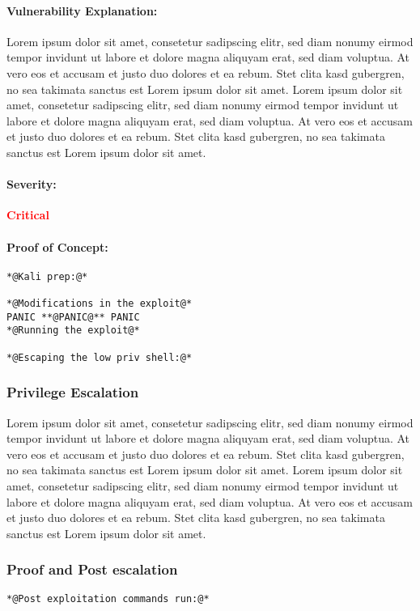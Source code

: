 \paragraph{Vulnerability Explanation:}
Lorem ipsum dolor sit amet, consetetur sadipscing elitr, sed diam nonumy eirmod
tempor invidunt ut labore et dolore magna aliquyam erat, sed diam voluptua. At
vero eos et accusam et justo duo dolores et ea rebum. Stet clita kasd
gubergren, no sea takimata sanctus est Lorem ipsum dolor sit amet. Lorem ipsum
dolor sit amet, consetetur sadipscing elitr, sed diam nonumy eirmod tempor
invidunt ut labore et dolore magna aliquyam erat, sed diam voluptua. At vero
eos et accusam et justo duo dolores et ea rebum. Stet clita kasd gubergren, no
sea takimata sanctus est Lorem ipsum dolor sit amet.

\paragraph{Severity:}
\textbf{\textcolor{red}{Critical}}

\paragraph{Proof of Concept:}
\begin{lstlisting}[caption={Exploitation of \hostname}]
*@Kali prep:@*

*@Modifications in the exploit@*
PANIC **@PANIC@** PANIC
*@Running the exploit@*

*@Escaping the low priv shell:@*
\end{lstlisting}


\ifdefined\root
\subsubsection{Privilege Escalation}
Lorem ipsum dolor sit amet, consetetur sadipscing elitr, sed diam nonumy eirmod
tempor invidunt ut labore et dolore magna aliquyam erat, sed diam voluptua. At
vero eos et accusam et justo duo dolores et ea rebum. Stet clita kasd
gubergren, no sea takimata sanctus est Lorem ipsum dolor sit amet. Lorem ipsum
dolor sit amet, consetetur sadipscing elitr, sed diam nonumy eirmod tempor
invidunt ut labore et dolore magna aliquyam erat, sed diam voluptua. At vero
eos et accusam et justo duo dolores et ea rebum. Stet clita kasd gubergren, no
sea takimata sanctus est Lorem ipsum dolor sit amet.
\fi


\subsubsection{Proof and Post escalation}
\begin{lstlisting}[caption={Post exploitation of \hostname},label=\hostname-post]
*@Post exploitation commands run:@*
\end{lstlisting}
